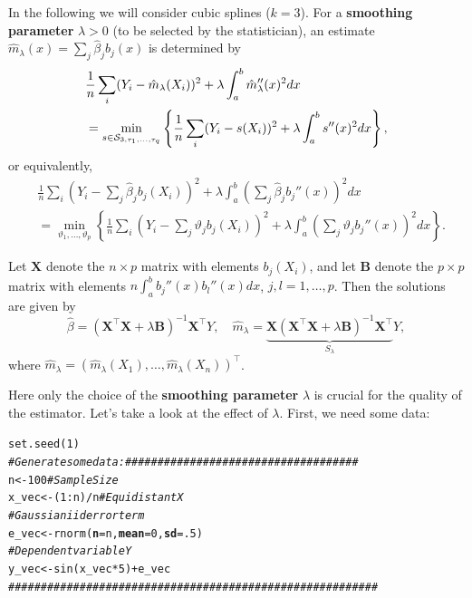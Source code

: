 \documentclass[14pt]{extreport}\usepackage[]{graphicx}\usepackage[]{xcolor}
\makeatletter
\newcommand{\hlnum}[1]{\textcolor[rgb]{0.69,0.494,0}{#1}}%
\newcommand{\hlcom}[1]{\textcolor[rgb]{0.514,0.506,0.514}{\textit{#1}}}%
\newcommand{\hlopt}[1]{\textcolor[rgb]{0,0,0}{#1}}%
\newcommand{\hlstd}[1]{\textcolor[rgb]{0,0,0}{#1}}%
\newcommand{\hlkwb}[1]{\textcolor[rgb]{0,0.341,0.682}{#1}}%
\newcommand{\hlkwc}[1]{\textcolor[rgb]{0,0,0}{\textbf{#1}}}%
\newcommand{\hlkwd}[1]{\textcolor[rgb]{0.004,0.004,0.506}{#1}}%
\newenvironment{kframe}{%
 \def\at@end@of@kframe{}%
 \ifinner\ifhmode%
  \def\at@end@of@kframe{\end{minipage}}%
  \begin{minipage}{\columnwidth}%
 \fi\fi%
 \def\FrameCommand##1{\hskip\@totalleftmargin \hskip-\fboxsep
 \colorbox{shadecolor}{##1}\hskip-\fboxsep
     \hskip-\linewidth \hskip-\@totalleftmargin \hskip\columnwidth}%
 \MakeFramed {\advance\hsize-\width
   \@totalleftmargin\z@ \linewidth\hsize
   \@setminipage}}%
 {\par\unskip\endMakeFramed%
 \at@end@of@kframe}
\newenvironment{knitrout}{}{} %
\makeatother
\begin{document}
\bigskip

In the following we will consider cubic splines ($k=3$). For a \textbf{smoothing parameter} $\lambda>0$ (to be selected by the statistician), an estimate $\hat m_\lambda(x)=\sum_j\hat\beta_j b_j(x)$ is determined by
\begin{align*}
&\frac{1}{n} \sum_i (Y_i-\hat m_\lambda(X_i))^2+\lambda \int_a^b \hat m_\lambda''(x)^2dx\\ &=
\min_{s\in {\cal{S}}_{3,\tau_1,\dots,\tau_q}}\left\{\frac{1}{n} \sum_i (Y_i-s(X_i))^2+\lambda \int_a^b s''(x)^2dx\right\},\end{align*}
or equivalently,
\begin{align*}
&\frac{1}{n} \sum_i (Y_i-\sum_j \hat\beta_j b_j(X_i))^2+\lambda \int_a^b (\sum_j \hat\beta_j b_j''(x))^2dx\\
&=\min_{\vartheta_1,\dots,\vartheta_p}\left\{ \frac{1}{n}
 \sum_i (Y_i-\sum_j\vartheta_j b_j(X_i))^2+\lambda \int_a^b (\sum_j \vartheta_j b_j''(x))^2dx\right\}.
\end{align*}

\bigskip

Let $\mathbf{X}$  denote the $n\times p$ matrix with elements $b_j(X_i)$, and let $\mathbf{B}$ denote the $p\times p$ matrix
with elements $n \int_a^b b_j''(x)b_l''(x)dx$, $j,l=1,\dots,p$. Then the solutions are given by
$$\hat\beta =(\mathbf{X}^\top \mathbf{X}+\lambda \mathbf{B})^{-1}\mathbf{X}^\top Y, \quad
\hat m_\lambda = \underbrace{\mathbf{X}(\mathbf{X}^\top \mathbf{X}+\lambda \mathbf{B})^{-1}\mathbf{X}^\top }_{S_\lambda}Y,$$
where $\hat m_\lambda=(\hat m_\lambda(X_1),\dots,\hat m_\lambda(X_n))^\top $.

\bigskip

Here only the choice of the \textbf{smoothing parameter} $\lambda$ is crucial for the quality of the estimator. Let's take a look at the effect of $\lambda$. First, we need some data:
\begin{knitrout}
\color{fgcolor}\begin{kframe}
\begin{alltt}
\hlkwd{set.seed}\hlstd{(}\hlnum{1}\hlstd{)}
\hlcom{# Generate some data: ####################################}
\hlstd{n}      \hlkwb{<-} \hlnum{100}     \hlcom{# Sample Size}
\hlstd{x_vec}  \hlkwb{<-} \hlstd{(}\hlnum{1}\hlopt{:}\hlstd{n)}\hlopt{/}\hlstd{n} \hlcom{# Equidistant X }
\hlcom{# Gaussian iid error term }
\hlstd{e_vec}  \hlkwb{<-} \hlkwd{rnorm}\hlstd{(}\hlkwc{n} \hlstd{= n,} \hlkwc{mean} \hlstd{=} \hlnum{0}\hlstd{,} \hlkwc{sd} \hlstd{=} \hlnum{.5}\hlstd{)}
\hlcom{# Dependent variable Y}
\hlstd{y_vec}  \hlkwb{<-}  \hlkwd{sin}\hlstd{(x_vec} \hlopt{*} \hlnum{5}\hlstd{)} \hlopt{+} \hlstd{e_vec}
\hlcom{#########################################################}
\end{alltt}
\end{kframe}
\end{knitrout}
\end{document}

